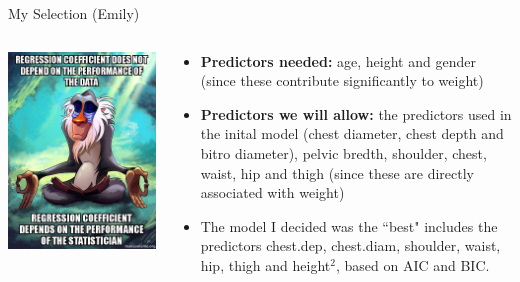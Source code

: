 \documentclass[table]{beamer}\usepackage[]{graphicx}\usepackage[]{color}
\begin{document}
\begin{frame}{My Selection (Emily)}

\begin{columns}[t] %
\begin{column}[T]{5cm} %
\includegraphics[width=\textwidth]{rafiki}
\end{column}

\begin{column}[T]{7cm} 

\begin{itemize}
\item \textbf{Predictors needed:} age, height and gender (since these contribute significantly to weight) \\

\item \textbf{Predictors we will allow:} the predictors used in the inital model (chest diameter, chest depth and bitro diameter), pelvic bredth, shoulder, chest, waist, hip and thigh (since these are directly associated with weight)\\

\item The model I decided was the ``best" includes the predictors chest.dep, chest.diam, shoulder, waist, hip, thigh and height$^2$, based on AIC and BIC.  \\
\end{itemize}

\end{column}
\end{columns}

\end{frame}
\end{document}
